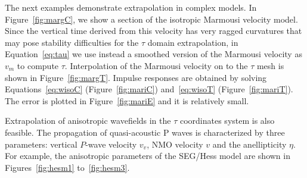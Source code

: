 
The next examples demonstrate extrapolation in complex models.
In Figure~\ref{fig:margC}, we show a section of the isotropic Marmousi velocity model. Since the vertical time derived from this velocity has very ragged curvatures that may pose stability difficulties for the $\tau$ domain extrapolation, in Equation~\ref{eq:tau} we use instead a smoothed version of the Marmousi velocity as $v_m$ to compute $\tau$. Interpolation of the Marmousi velocity on to the $\tau$ mesh is shown in Figure~\ref{fig:margT}. 
Impulse responses are obtained by solving Equations~\ref{eq:wisoC} (Figure~\ref{fig:mariC}) and~\ref{eq:wisoT} (Figure~\ref{fig:mariT}).
The error is plotted in Figure~\ref{fig:mariE} and it is relatively small.



Extrapolation of anisotropic wavefields in the $\tau$ coordinates system is also feasible. The propagation of quasi-acoustic P waves is characterized by three parameters: vertical $P$-wave velocity $v_v$, NMO velocity $v$ and the anellipticity $\eta$.
For example, the anisotropic parameters of the SEG/Hess model are shown in Figures~\ref{fig:hesm1} to~\ref{fig:hesm3}.


